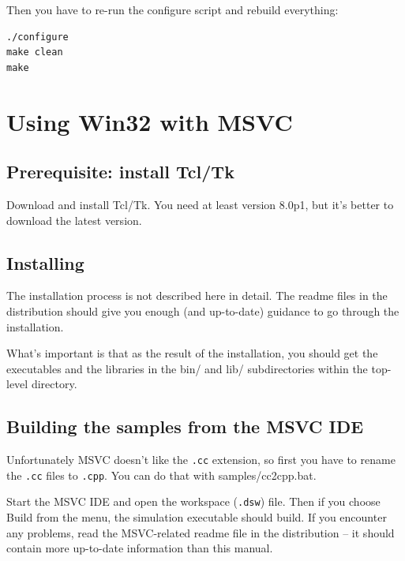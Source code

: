 Then you have to re-run the configure script and rebuild everything:

\begin{Verbatim}
./configure
make clean
make
\end{Verbatim}



\section{Using Win32 with MSVC}

\subsection{Prerequisite: install Tcl/Tk}

Download and install Tcl/Tk. You need at least version 8.0p1, 
but it's better to download the latest version.





\subsection{Installing {\opp}}

The installation process is not described here in detail. The 
readme files in the distribution should give you enough (and 
up-to-date) guidance to go through the installation.

What's important is that as the result of the installation, you 
should get the executables and the libraries in the bin/ and lib/ 
subdirectories within the top-level {\opp} directory.





\subsection{Building the samples from the MSVC IDE}

Unfortunately MSVC doesn't like the \texttt{.cc} extension, so first
you have to rename the \texttt{.cc} files to \texttt{.cpp}. You can do
that with samples/cc2cpp.bat.


Start the MSVC IDE and open the workspace (\texttt{.dsw}) file. Then
if you choose Build from the menu, the simulation executable should
build. If you encounter any problems, read the MSVC-related readme
file in the distribution -- it should contain more up-to-date
information than this manual.

